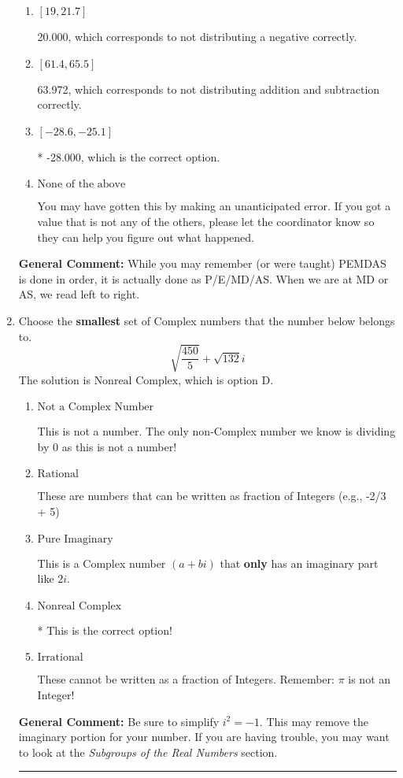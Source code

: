 \documentclass{extbook}[14pt]
\newcommand{\litem}[1]{\item #1

\rule{\textwidth}{0.4pt}}
\begin{document}
\begin{enumerate}
{\begin{enumerate}[label=\Alph*.]
 -24.028, which corresponds to an Order of Operations error: not reading left-to-right for multiplication/division.
\item \( [19, 21.7] \)

 20.000, which corresponds to not distributing a negative correctly.
\item \( [61.4, 65.5] \)

 63.972, which corresponds to not distributing addition and subtraction correctly.
\item \( [-28.6, -25.1] \)

* -28.000, which is the correct option.
\item \( \text{None of the above} \)

 You may have gotten this by making an unanticipated error. If you got a value that is not any of the others, please let the coordinator know so they can help you figure out what happened.
\end{enumerate}

\textbf{General Comment:} While you may remember (or were taught) PEMDAS is done in order, it is actually done as P/E/MD/AS. When we are at MD or AS, we read left to right.
}
\litem{
Choose the \textbf{smallest} set of Complex numbers that the number below belongs to.
\[ \sqrt{\frac{450}{5}}+\sqrt{132} i \]The solution is \( \text{Nonreal Complex} \), which is option D.\begin{enumerate}[label=\Alph*.]
\item \( \text{Not a Complex Number} \)

This is not a number. The only non-Complex number we know is dividing by 0 as this is not a number!
\item \( \text{Rational} \)

These are numbers that can be written as fraction of Integers (e.g., -2/3 + 5)
\item \( \text{Pure Imaginary} \)

This is a Complex number $(a+bi)$ that \textbf{only} has an imaginary part like $2i$.
\item \( \text{Nonreal Complex} \)

* This is the correct option!
\item \( \text{Irrational} \)

These cannot be written as a fraction of Integers. Remember: $\pi$ is not an Integer!
\end{enumerate}

\textbf{General Comment:} Be sure to simplify $i^2 = -1$. This may remove the imaginary portion for your number. If you are having trouble, you may want to look at the \textit{Subgroups of the Real Numbers} section.
}
\end{enumerate}
\end{document}
